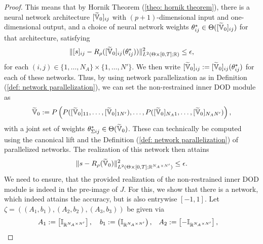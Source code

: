 \begin{proof}
    This means that by Hornik Theorem (\ref{theo: hornik theorem}), there is a neural network architecture 
    $[\widetilde{\mathbb{V}}_0]_{ij}$ with $(p+1)$-dimensional input and one-dimensional output, 
    and a choice of neural network weights $\theta^*_{ij} \in \Theta([\widetilde{\mathbb{V}}_0]_{ij})$ 
    for that architecture, satisfying
    \begin{equation*}
        \lVert [s]_{ij} - R_\rho([\widetilde{\mathbb{V}}_0]_{ij}(\theta^*_{ij})) \rVert^2_{L^2(\Theta \times [0, T]; \mathbb{R})} \leq \epsilon,
    \end{equation*}
    for each $(i, j) \in \{1, \dots, N_A\} \times \{1, \dots, N'\}$.
    We then write $[\widetilde{\mathbb{V}}_0]_{ij} := [\widetilde{\mathbb{V}}_0]_{ij}(\theta^*_{ij})$ for each of
    these networks. Thus, by using network parallelization 
    as in Definition (\ref{def: network parallelization}), we can set the non-restrained inner DOD module as
    \begin{equation*}
        \widetilde{\mathbb{V}}_0 := P\left(P([\widetilde{\mathbb{V}}_0]_{1 1}, \dots, [\widetilde{\mathbb{V}}_0]_{1 N'}), \dots, 
        P([\widetilde{\mathbb{V}}_0]_{N_A  1}, \dots,
        [\widetilde{\mathbb{V}}_0]_{N_A N'})\right),
    \end{equation*}
    with a joint set of weights $\theta^*_{\Sigma ij} \in \Theta(\widetilde{\mathbb{V}}_0)$. These can technically be 
    computed using the canonical lift and the Definition (\ref{def: network parallelization}) of parallelized networks. 
    The realization of this network then attains
    \begin{equation*}
        \lVert s - R_\rho(\widetilde{\mathbb{V}}_0) \rVert^2_{L^2(\Theta \times [0, T]; \mathbb{R}^{N_A \times N'})} \leq
        \epsilon.
    \end{equation*}
    We need to ensure, that the provided realization of the non-restrained inner DOD module is indeed in the pre-image of $J$.
    For this, we show that there is a network, which indeed attains the accuracy, but is also entrywise $[-1,1]$.
    Let $\zeta = ((A_1, b_1), (A_2, b_2), (A_3, b_3))$ be given via
    \begin{align*}
        A_1 := \begin{bmatrix}
            \I_{\R^{N_A \times N'}} 
        \end{bmatrix},
        \quad
        b_1 := \begin{pmatrix}
            \I_{\R^{N_A \times N'}}
        \end{pmatrix},&
        \quad
        A_2 := \begin{bmatrix}
            -\I_{\R^{N_A \times N'}}
        \end{bmatrix},

\end{align*}
\end{proof}
